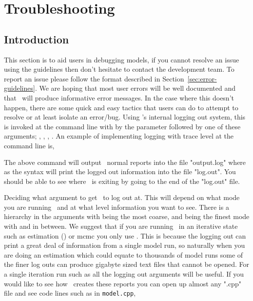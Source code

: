 \section{Troubleshooting\label{sec:trouble-shooting}}

\subsection{Introduction}
This section is to aid users in debugging models, if you cannot resolve an issue using the guidelines then don't hesitate to contact the development team. To report an issue please follow the format described in Section~\ref{sec:error-guidelines}. We are hoping that most user errors will be well documented and that \CNAME\ will produce informative error messages. In the case where this doesn't happen, there are some quick and easy tactics that users can do to attempt to resolve or at least isolate an error/bug. Using \CNAME's internal logging out system, this is invoked at the command line with by the  parameter followed by one of these arguments; , , , . An example of implementing logging with trace level at the command line is,\textsl{}


The above command will output \CNAME\ normal reports into the file "output.log" where as the  syntax will print the logged out information into the file "log.out". You should be able to see where \CNAME\ is exiting by going to the end of the "log.out" file. 

Deciding what argument to get \CNAME\ to log out at. This will depend on what mode you are running \CNAME\ and at what level information you want to see. There is a hierarchy in the arguments with  being the most coarse, and  being the finest mode with  and  in between. We suggest that if you are running \CNAME\ in an iterative state such as estimation () or mcmc you only use . This is because the logging out can print a great deal of information from a single model run, so naturally when you are doing an estimation which could equate to thousands of model runs some of the finer log outs can produce gigabyte sized text files that cannot be opened. For a single iteration run such as  all the logging out arguments will be useful. If you would like to see how \CNAME\ creates these reports you can open up almost any ".cpp" file and see code lines such as in \texttt{model.cpp},


